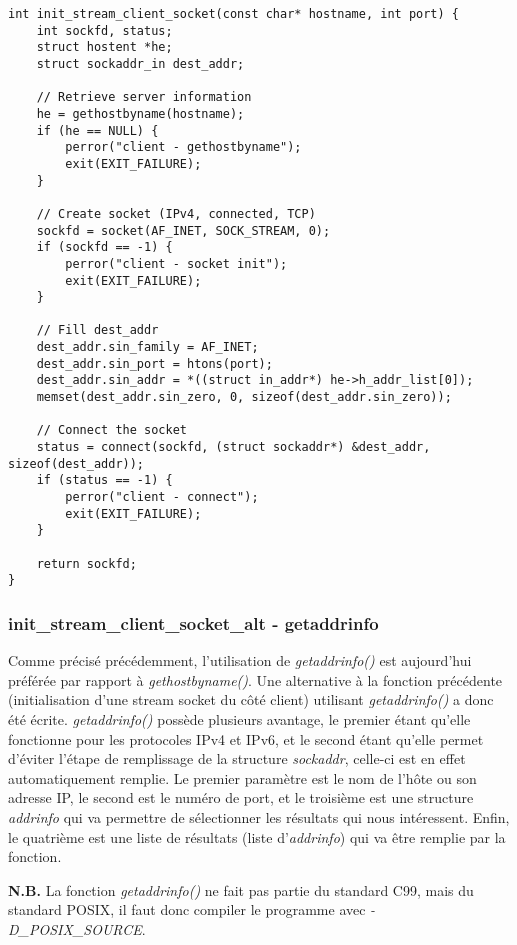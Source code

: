 \documentclass[a4paper, frenchb, 11pt]{article}
\begin{document}
\begin{lstlisting}
int init_stream_client_socket(const char* hostname, int port) {
    int sockfd, status;
    struct hostent *he;
    struct sockaddr_in dest_addr;

    // Retrieve server information
    he = gethostbyname(hostname);
    if (he == NULL) {
        perror("client - gethostbyname");
        exit(EXIT_FAILURE);
    }

    // Create socket (IPv4, connected, TCP)
    sockfd = socket(AF_INET, SOCK_STREAM, 0);
    if (sockfd == -1) {
        perror("client - socket init");
        exit(EXIT_FAILURE);
    }

    // Fill dest_addr
    dest_addr.sin_family = AF_INET;
    dest_addr.sin_port = htons(port);
    dest_addr.sin_addr = *((struct in_addr*) he->h_addr_list[0]);
    memset(dest_addr.sin_zero, 0, sizeof(dest_addr.sin_zero));

    // Connect the socket
    status = connect(sockfd, (struct sockaddr*) &dest_addr, sizeof(dest_addr));
    if (status == -1) {
        perror("client - connect");
        exit(EXIT_FAILURE);
    }

    return sockfd;
}
\end{lstlisting}

\subsubsection{init\_stream\_client\_socket\_alt - getaddrinfo}
Comme précisé précédemment, l'utilisation de \emph{getaddrinfo()} est aujourd'hui préférée par rapport à \emph{gethostbyname()}. Une alternative à la fonction précédente (initialisation d'une stream socket du côté client) utilisant \emph{getaddrinfo()} a donc été écrite. \emph{getaddrinfo()} possède plusieurs avantage, le premier étant qu'elle fonctionne pour les protocoles IPv4 et IPv6, et le second étant qu'elle permet d'éviter l'étape de remplissage de la structure \emph{sockaddr}, celle-ci est en effet automatiquement remplie. Le premier paramètre est le nom de l'hôte ou son adresse IP, le second est le numéro de port, et le troisième est une structure \emph{addrinfo} qui va permettre de sélectionner les résultats qui nous intéressent. Enfin, le quatrième est une liste de résultats (liste d'\emph{addrinfo}) qui va être remplie par la fonction.\\

\begin{mdframed}[backgroundcolor=lightblue, linecolor=darkblue]
\noindent \textbf{N.B.} La fonction \emph{getaddrinfo()} ne fait pas partie du standard C99, mais du standard POSIX, il faut donc compiler le programme avec \emph{-D\_POSIX\_SOURCE}.
\end{mdframed}
\end{document}
